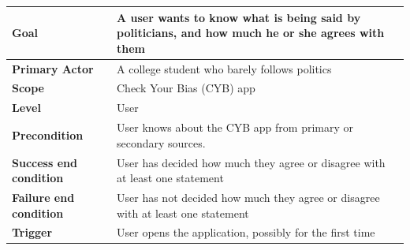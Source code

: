 \documentclass[11pt]{article}
\begin{document}
\def\arraystretch{1.5}
\begin{centering}
\begin{tabular}{|p{2.5cm}|p{13cm}|}
    \hline
    \textbf{Goal} & A user wants to know what is being said by politicians, and how much he or she agrees with them\\
    \hline
    \textbf{Primary \newline Actor} & A college student who barely follows politics\\
    \hline
    \textbf{Scope} & Check Your Bias (CYB) app\\
    \hline
    \textbf{Level} & User\\
    \hline
    \textbf{Precondition} & User knows about the CYB app from primary or secondary sources.\\
    \hline
    \textbf{Success end \newline condition} & User has decided how much they agree or disagree with at least one statement\\
    \hline
    \textbf{Failure end \newline condition} & User has not decided how much they agree or disagree with at least one statement\\
    \hline
    \textbf{Trigger} & User opens the application, possibly for the first time\\
    \hline
\end{tabular}

\vspace{10pt}


\end{centering}
\end{document}
